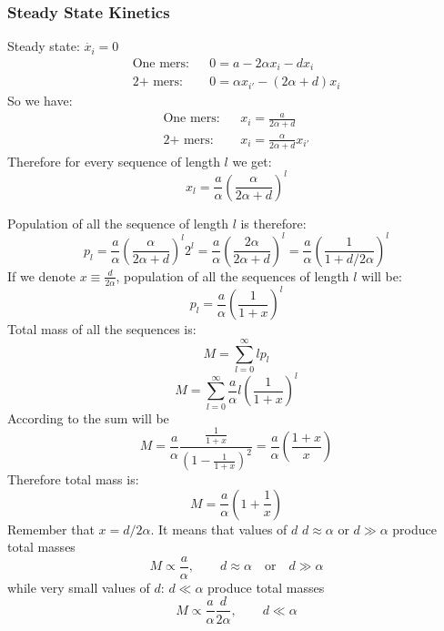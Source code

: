\documentclass[twoside,twocolumn,9pt]{article}
\newcommand{\ga}{\alpha}
\newcommand{\pt}[1]{\left( #1\right)}
\begin{document}
\subsubsection{Steady State Kinetics}\label{sec:nowak-steady}
Steady state: $\dot{x_i}=0$
  \begin{eqnarray}
   \mbox{One mers:}&& 0=a-2\ga x_i-dx_i \\
     \mbox{2+ mers:}&& 0=\ga x_{i'}-(2\ga+d)x_i
  \end{eqnarray}
  So we have:
   \begin{eqnarray}
   \mbox{One mers:}&& x_i=\frac{a}{2\ga+d} \\
     \mbox{2+ mers:}&& x_i=\frac{\ga}{2\ga+d}x_{i'}
  \end{eqnarray}   
 Therefore for every sequence of length $l$ we get:
   \begin{equation}
   \boxed{ x_l=\frac{a}{\ga}\pt{\frac{\ga}{2\ga+d}}^l}
   \end{equation} 

Population of all the sequence of length $l$ is therefore:
  \begin{equation}
    p_l=\frac{a}{\ga}\pt{\frac{\ga}{2\ga+d}}^l2^l=\frac{a}{\ga}\pt{\frac{2\ga}{2\ga+d}}^l=
    \frac{a}{\ga}\pt{\frac{1}{1+d/2\ga}}^l
  \end{equation} 
If we denote $x\equiv\frac{d}{2\ga}$, population of all the sequences of length $l$ will be:
\begin{equation}
\boxed{ p_l=\frac{a}{\ga}\pt{\frac{1}{1+x}}^l}
\end{equation} 
Total mass of all the sequences is:
\begin{equation}
 M=\sum_{l=0}^{\infty}lp_l
\end{equation} 
\begin{equation}
 M=\sum_{l=0}^{\infty}\frac{a}{\ga}l\pt{\frac{1}{1+x}}^l
\end{equation} 
According to \cite{Gradstein1980} the sum will be
\begin{equation}
 M=\frac{a}{\ga}\frac{\frac{1}{1+x}}{\pt{1-\frac{1}{1+x}}^2}=\frac{a}{\ga}\pt{\frac{1+x}{x}}
\end{equation}
Therefore total mass is:
  \begin{equation}
   M=\frac{a}{\ga}\pt{1+\frac{1}{x}}
  \end{equation} 
Remember that $x=d/2\ga$. It means that values of $d$ $d\approx \ga$ or $d\gg \ga$ produce total 
masses 
\begin{equation}
 M\propto\frac{a}{\ga}, \qquad d\approx \ga\quad \mbox{or}\quad d\gg \ga
\end{equation} 
while very small values of $d:\,d\ll\ga$ produce total masses 
\begin{equation}
M\propto \frac{a}{\ga}\frac{d}{2\ga} ,\qquad d\ll\ga
\end{equation}



 

\end{document}
